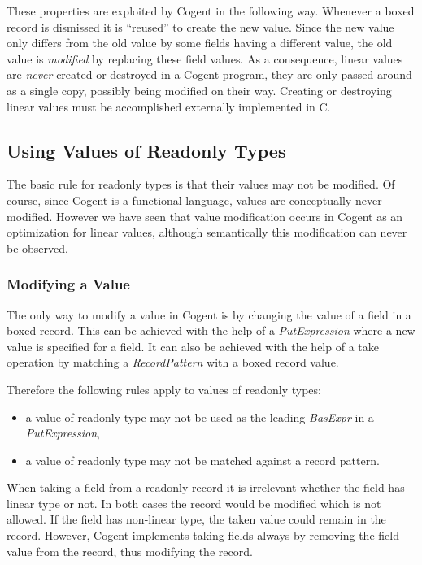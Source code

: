\documentclass[a4paper]{report}
\newcommand{\cogent}{Cogent\xspace}
\begin{document}
These properties are exploited by \cogent in the following way. Whenever a boxed record is dismissed it is ``reused'' to create the 
new value. Since the new value only differs from the old value by some fields having a different value, the old value is \textit{modified}
by replacing these field values. As a consequence, linear values are \textit{never} created or destroyed in a \cogent program, 
they are only passed around as a single copy, possibly being modified on their way. Creating or destroying linear values must be accomplished 
externally implemented in C.

\subsection{Using Values of Readonly Types}

The basic rule for readonly types is that their values may not be modified. Of course, since \cogent is a functional language,
values are conceptually never modified. However we have seen that value modification occurs in \cogent as an optimization for
linear values, although semantically this modification can never be observed. 

\subsubsection{Modifying a Value}

The only way to modify a value in \cogent is by changing the value of a field in a boxed record. This can be achieved
with the help of a \textit{PutExpression} where a new value is specified for a field. It can also be achieved with the
help of a \cbstart take operation by matching a \textit{RecordPattern} with a boxed record value. \cbend

Therefore the following rules apply to values of readonly types:
\begin{itemize}
\item a value of readonly type may not be used as the leading \textit{BasExpr} in a \textit{PutExpression},
\item a value of readonly type may not be matched against a \cbdelete record pattern.
\end{itemize}

\cbstart
When taking a field from a readonly record it is irrelevant whether the field has linear type or not. In both cases
the record would be modified which is not allowed. If the field has non-linear type, the taken value could
remain in the record. However, \cogent implements taking fields always by removing the field value from the record, 
thus modifying the record.
\cbend
\end{document}
